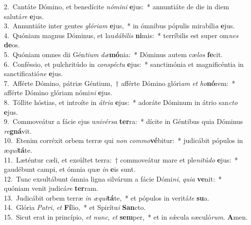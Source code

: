 {2.~}Cantáte Dómino, et benedícite \textit{nó}\textit{mi}\textit{ni} \textbf{e}jus:~* annuntiáte de die in diem salutá\textit{re} \textbf{e}jus.\\
{3.~}Annuntiáte inter gentes \textit{gló}\textit{ri}\textit{am} \textbf{e}jus,~* in ómnibus pópulis mirabíli\textit{a} \textbf{e}jus.\\
{4.~}Quóniam magnus Dóminus, et lau\textit{dá}\textit{bi}\textit{lis} \textbf{ni}mis:~* terríbilis est super om\textit{nes} \textbf{de}os.\\
{5.~}Quóniam omnes dii Gén\textit{ti}\textit{um} \textit{dæ}\textbf{mó}nia:~* Dóminus autem cæ\textit{los} \textbf{fe}cit.\\
{6.~}Conféssio, et pulchritúdo in \textit{con}\textit{spé}\textit{ctu} \textbf{e}jus:~* sanctimónia et magnificéntia in sanctificatió\textit{ne} \textbf{e}jus.\\
{7.~}Afférte Dómino, pátriæ Géntium,~† afférte Dómino glóri\textit{am} \textit{et} \textit{ho}\textbf{nó}rem:~* afférte Dómino glóriam nómi\textit{ni} \textbf{e}jus.\\
{8.~}Tóllite hóstias, et introíte in \textit{á}\textit{tri}\textit{a} \textbf{e}jus:~* adoráte Dóminum in átrio san\textit{cto} \textbf{e}jus.\\
{9.~}Commoveátur a fácie ejus u\textit{ni}\textit{vér}\textit{sa} \textbf{ter}ra:~* dícite in Géntibus quia Dóminus \textit{re}\textbf{gná}vit.\\
{10.~}Etenim corréxit orbem terræ qui \textit{non} \textit{com}\textit{mo}\textbf{vé}bitur:~* judicábit pópulos in æ\textit{qui}\textbf{tá}te.\\
{11.~}Læténtur cæli, et exsúltet terra:~† commoveátur mare et ple\textit{ni}\textit{tú}\textit{do} \textbf{e}jus:~* gaudébunt campi, et ómnia quæ \textit{in} \textbf{e}is sunt.\\
{12.~}Tunc exsultábunt ómnia ligna silvárum a fácie Dómi\textit{ni}, \textit{qui}\textit{a} \textbf{ve}nit:~* quóniam venit judicá\textit{re} \textbf{ter}ram.\\
{13.~}Judicábit orbem terræ \textit{in} \textit{æ}\textit{qui}\textbf{tá}te,~* et pópulos in veritá\textit{te} \textbf{su}a.\\
{14.~}Glória \textit{Pa}\textit{tri}, \textit{et} \textbf{Fí}lio,~* et Spirítu\textit{i} \textbf{San}cto.\\
{15.~}Sicut erat in princípio, \textit{et} \textit{nunc}, \textit{et} \textbf{sem}per,~* et in sǽcula sæculó\textit{rum}. \textbf{A}men.\\

